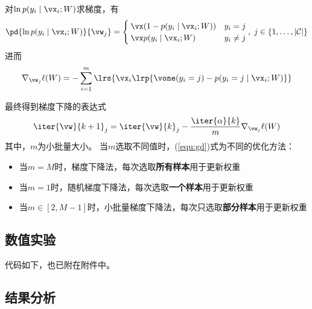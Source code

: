 \documentclass[logo,reportComp]{thesis}
\begin{document}
对$\ln p(y_i\mid\vx_i;W)$求梯度，有
\[\pd{\ln p(y_i\mid\vx_i;W)}{\vw_j}=
\begin{cases}
\vx(1-p(y_i\mid\vx_i;W)) & y_i=j\\
\vx p(y_i\mid\vx_i;W) & y_i\ne j
\end{cases},\;j\in\{1,\ldots,|\mathcal{C}|\}\]
进而
\begin{equation}
\nabla_{\vw_j}\ell(W)=-\sum_{i=1}^m\lrs{\vx_i\lrp{\vone(y_i=j)-p(y_i=j\mid\vx_i;W)}}
\end{equation}

最终得到梯度下降的表达式
\begin{equation}
\label{equ:gd}
\iter{\vw}{k+1}_j=\iter{\vw}{k}_j-\frac{\iter{\alpha}{k}}{m}\nabla_{\vw_j}\ell(W)
\end{equation}
其中，$m$为小批量大小。
当$m$选取不同值时，(\ref{equ:gd})式为不同的优化方法：
\begin{itemize}
\item 当$m=M$时，梯度下降法，每次选取\textbf{所有样本}用于更新权重
\item 当$m=1$时，随机梯度下降法，每次选取\textbf{一个样本}用于更新权重
\item 当$m\in[2,M-1]$时，小批量梯度下降法，每次只选取\textbf{部分样本}用于更新权重
\end{itemize}

\subsection{数值实验}
代码如下，也已附在附件中。


\subsection{结果分析}


\end{document}
